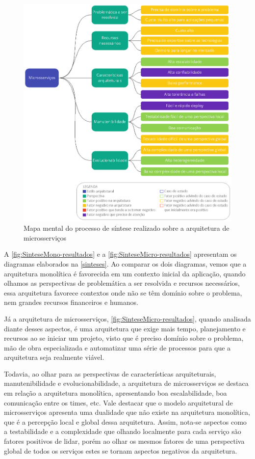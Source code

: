 \begin{figure}[h]
  \centering
  \includegraphics[keepaspectratio=true,scale=1]{figuras/sintese-microsservicos.eps}
  \caption{Mapa mental do processo de síntese realizado sobre a arquitetura de microsserviços\label{fig:SinteseMicro-resultados}}
\end{figure}

A \autoref{fig:SinteseMono-resultados} e a \autoref{fig:SinteseMicro-resultados} apresentam os
diagramas elaborados na \autoref{sinteses}. Ao comparar os dois diagramas, vemos que a arquitetura
monolítica é favorecida em um contexto inicial da aplicação, quando olhamos as perspectivas de
problemática a ser resolvida e recursos necessários, essa arquitetura favorece contextos onde não se
têm domínio sobre o problema, nem grandes recursos financeiros e humanos.

Já a arquitetura de microsserviços, \autoref{fig:SinteseMicro-resultados}, quando analisada diante
desses aspectos, é uma arquitetura que exige mais tempo, planejamento e recursos ao se iniciar um
projeto, visto que é preciso domínio sobre o problema, mão de obra especializada e
automatizar uma série de processos para que a arquitetura seja realmente viável.

Todavia, ao olhar para as perspectivas de características arquiteturais, manutenibilidade e
evolucionabilidade, a arquitetura de microsserviços se destaca em relação a arquitetura monolítica,
apresentando boa escalabilidade, boa comunicação entre os times, etc. Vale destacar que o modelo
arquitetural de microsserviços apresenta uma dualidade que não existe na arquitetura monolítica,
que é a percepção local e global dessa arquitetura. Assim, nota-se aspectos como a testabilidade e a
complexidade que olhando localmente para cada serviço são fatores positivos de lidar, porém ao
olhar os mesmos fatores de uma perspectiva global de todos os serviços estes se tornam aspectos
negativos da arquitetura.

